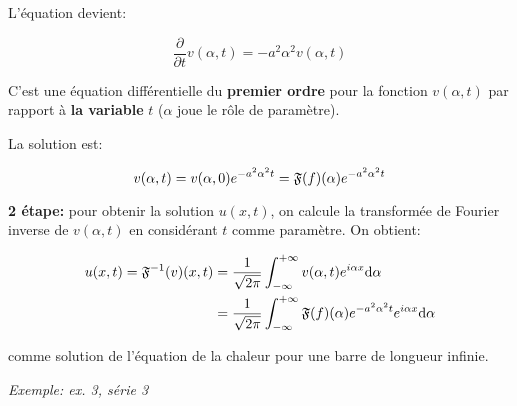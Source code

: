 \begin{enumerate}[label=\alph*)]
\begin{description}
    L'équation devient:
    
    \[
    \frac{\partial}{\partial t} v(\alpha,t) = - a^2 \alpha^2 v(\alpha,t)
    \]
    
    C'est une équation différentielle du \textbf{premier ordre} pour la fonction $v(\alpha,t)$ par rapport à \textbf{la variable} $t$ ($\alpha$ joue le rôle de paramètre).
    
    La solution est:
    
    \[
    v(\alpha,t) = v(\alpha,0) e^{- a^2 \alpha^2 t} = \mathfrak{F}(f)(\alpha) e^{- a^2 \alpha^2 t}
    \]
    
    \textbf{2\ieme{} étape:} pour obtenir la solution $u(x,t)$, on calcule la transformée de Fourier inverse de $v(\alpha,t)$ en considérant $t$ comme paramètre.
    On obtient:
    
    \begin{align*}
    u(x,t) = \mathfrak{F}^{-1}(v)(x,t) &=
    \frac{1}{\sqrt{2 \pi}} \int_{-\infty}^{+\infty} v(\alpha,t) e^{i\alpha x} \mathrm{d}\alpha
    \\&=
    \frac{1}{\sqrt{2 \pi}} \int_{-\infty}^{+\infty} \mathfrak{F}(f)(\alpha) e^{-a^2 \alpha^2 t} e^{i\alpha x} \mathrm{d}\alpha
    \end{align*}
    
    comme solution de l'équation de la chaleur pour une barre de longueur infinie.
    
    \textit{Exemple: ex. 3, série 3}
    \end{description}
\end{enumerate}
